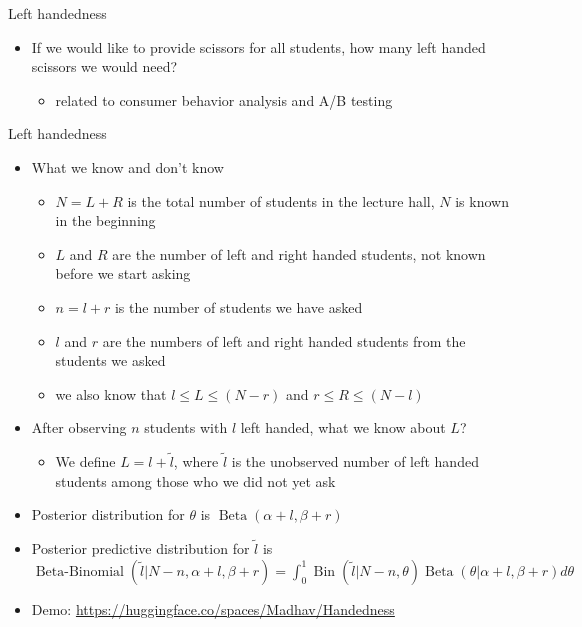 \documentclass[english,t]{beamer}
\DeclareMathOperator{\Bin}{Bin}
\DeclareMathOperator{\Beta}{Beta}
\DeclareMathOperator{\BetaBinomial}{Beta-Binomial}
\begin{document}
\begin{frame}{Left handedness}

  \begin{itemize}
  \item<+-> If we would like to provide scissors for all students, how
    many left handed scissors we would need?
    \begin{itemize}
    \item related to consumer behavior analysis and A/B testing
  \end{itemize}
\end{itemize}  

\end{frame}

\begin{frame}{Left handedness}

  \vspace{-0.5\baselineskip}
  \begin{itemize}
  \item<+-> What we know and don't know
    \begin{itemize}
    \item $N=L+R$ is the total number of students in the lecture hall,
      $N$ is known in the beginning
    \item<+-> $L$ and $R$ are the number of left and right handed students, not known before we start asking
    \item<+-> $n=l+r$ is the number of students we have asked
    \item<+-> $l$ and $r$ are the numbers of left and right handed students from the students we asked
    \item<+-> we also know that $l \leq L \leq (N-r)$ and $r \leq R \leq (N-l)$
    \end{itemize}
  \item<+-> After observing $n$ students with $l$ left handed, what we
    know about $L$?
    \begin{itemize}
    \item We define $L=l+\tilde{l}$, where $\tilde{l}$ is the
      unobserved number of left handed students among those who we did
      not yet ask
    \end{itemize}
  \item<+-> {\color{blue} Posterior} distribution for
    $\theta$ is $\Beta(\alpha+l, \beta+r)$
  \item<+-> {\color{red} Posterior predictive} distribution for
    $\tilde{l}$ is\\
    $\BetaBinomial(\tilde{l} | N-n, \alpha+l, \beta+r)=\int_0^1\Bin(\tilde{l} | N-n, \theta)\Beta(\theta | \alpha+l, \beta+r)d\theta$
  \item<+-> {\small Demo: \url{https://huggingface.co/spaces/Madhav/Handedness}}
  \end{itemize}
  
\end{frame}
\end{document}
